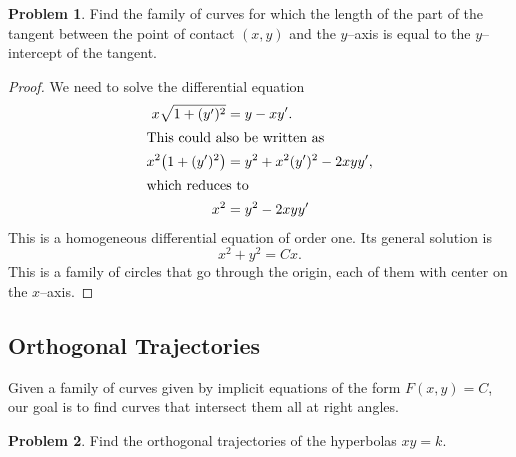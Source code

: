 \documentclass{scrartcl}
\theoremstyle{definition}
\newtheorem*{problem*}{Problem}
\begin{document}
\begin{problem*}
Find the family of curves for which the length of the part of the
tangent between the point of contact $(x,y)$ and the $y$--axis is
equal to the $y$--intercept of the tangent. 
\end{problem*}
\begin{proof}
We need to solve the differential equation
\begin{align*}
x\sqrt{1+(y')^2} &= y-xy'. \\
\intertext{This could also be written as}
x^2 \big( 1 + (y')^2 \big) &= y^2 + x^2(y')^2 - 2xyy', \\
\intertext{which reduces to}
x^2 &= y^2 -2xyy'
\end{align*}
This is a homogeneous differential equation of order one.  Its general solution is
\begin{equation*}
x^2+y^2=Cx.
\end{equation*}
This is a family of circles that go through the origin, each of them with center on the $x$--axis.
\end{proof}

\subsection*{Orthogonal Trajectories}
Given a family of curves given by implicit equations of the form
$F(x,y)=C$, our goal is to find curves that intersect them all at right angles.

\begin{problem*}
Find the orthogonal trajectories of the hyperbolas $xy=k$.
\end{problem*}
\end{document}
